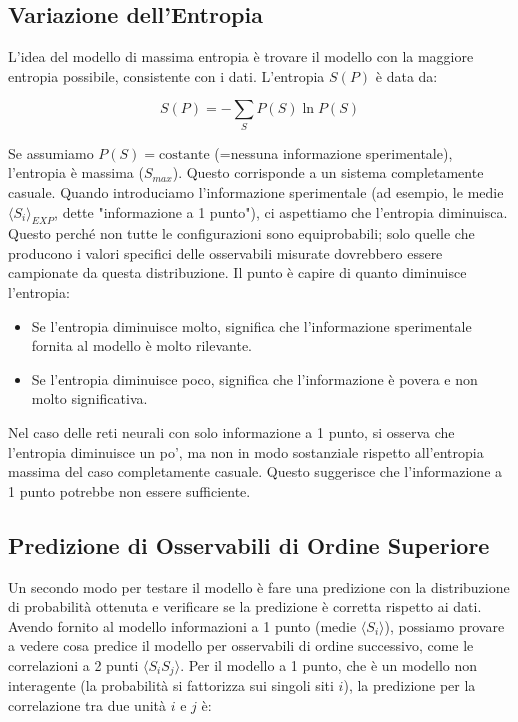 \subsection*{Variazione dell'Entropia}
L'idea del modello di massima entropia è trovare il modello con la maggiore entropia possibile, consistente con i dati. L'entropia $S(P)$ è data da:

\begin{equation} \label{eq:ch23_8}
S(P) = -\sum_S P(S) \ln P(S)
\end{equation}

Se assumiamo $P(S) = \text{costante}$ (=nessuna informazione sperimentale), l'entropia è massima ($S_{max}$). Questo corrisponde a un sistema completamente casuale.
Quando introduciamo l'informazione sperimentale (ad esempio, le medie $\langle S_i \rangle_{EXP}$, dette "informazione a 1 punto"), ci aspettiamo che l'entropia diminuisca. Questo perché non tutte le configurazioni sono equiprobabili; solo quelle che producono i valori specifici delle osservabili misurate dovrebbero essere campionate da questa distribuzione.
Il punto è capire di quanto diminuisce l'entropia:
\begin{itemize}
    \item Se l'entropia diminuisce molto, significa che l'informazione sperimentale fornita al modello è molto rilevante.
    \item Se l'entropia diminuisce poco, significa che l'informazione è povera e non molto significativa.
\end{itemize}

Nel caso delle reti neurali con solo informazione a 1 punto, si osserva che l'entropia diminuisce un po', ma non in modo sostanziale rispetto all'entropia massima del caso completamente casuale. Questo suggerisce che l'informazione a 1 punto potrebbe non essere sufficiente.

\subsection*{Predizione di Osservabili di Ordine Superiore}
Un secondo modo per testare il modello è fare una predizione con la distribuzione di probabilità ottenuta e verificare se la predizione è corretta rispetto ai dati. Avendo fornito al modello informazioni a 1 punto (medie $\langle S_i \rangle$), possiamo provare a vedere cosa predice il modello per osservabili di ordine successivo, come le correlazioni a 2 punti $\langle S_i S_j \rangle$.
Per il modello a 1 punto, che è un modello non interagente (la probabilità si fattorizza sui singoli siti $i$), la predizione per la correlazione tra due unità $i$ e $j$ è:

